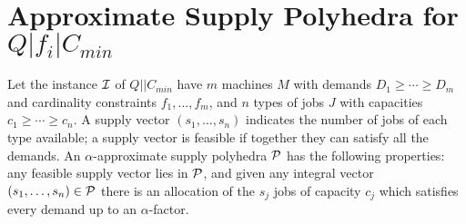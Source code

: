 \documentclass{article}[11pt]
\begin{document}
\section{Approximate Supply Polyhedra for $Q|f_i|C_{min}$}
Let the instance ${\cal I}$ of $Q||C_{min}$  have $m$ machines $M$ with demands $D_1 \geq \cdots \geq D_m$ and cardinality constraints $f_1,\ldots,f_m$, and $n$ types of  jobs $J$ with capacities $c_1 \geq \cdots \geq c_n$. 
A supply vector $(s_1,\ldots,s_n)$ indicates the number of jobs of each type available; a supply vector is feasible if together they can satisfy all the demands.
An $\alpha$-approximate supply polyhedra ${\cal P}$ has the following properties: any feasible supply vector lies in ${\cal P}$, and given any integral vector $(s_1,\ldots,s_n) \in {\cal P}$ there is an allocation 
of the $s_j$ jobs of capacity $c_j$ which satisfies every demand up to an $\alpha$-factor.
\smallskip
\end{document}
